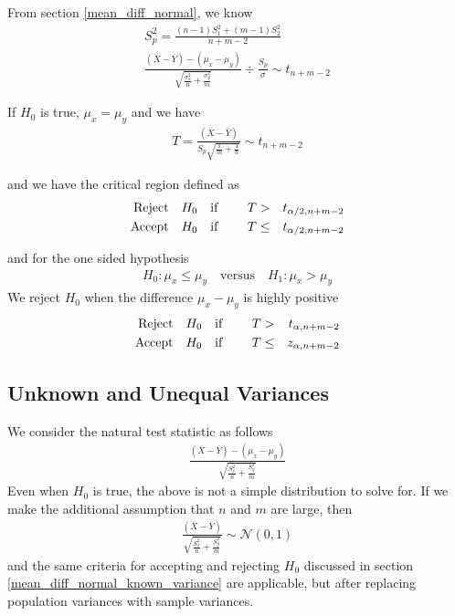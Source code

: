 \documentclass[../probability-notes.tex]{subfiles}
\begin{document}
    From section \ref{mean_diff_normal}, we know
    \begin{align*}
        S_{p}^{2} = \frac{(n-1)S_{1}^{2} + (m-1)S_{2}^{2}}{n + m - 2}\\
        \frac{(\overline{X} - \overline{Y}) - (\mu_{x} - \mu_{y})}{\sqrt{\frac{\sigma_{x}^{2}}{n} + \frac{\sigma_{y}^{2}}{m}}} \div \frac{S_{p}}{\sigma} \sim t_{n+m-2}
    \end{align*}

    If $H_{0}$ is true, $\mu_{x} = \mu_{y}$ and we have
    \begin{align*}
        T = \frac{(\overline{X} - \overline{Y})}{S_{p}\sqrt{\frac{1}{m} + \frac{1}{n}}} \sim t_{n+m-2}
    \end{align*}

    and we have the critical region defined as
    \begin{alignat*}{4}
        \text{Reject\quad} &H_{0} \text{\quad if \quad} &T &> &t_{\alpha/2, n+m-2}\\
        \text{Accept\quad} &H_{0} \text{\quad if\quad} &T &\leq &t_{\alpha/2, n+m-2}
    \end{alignat*}

    and for the one sided hypothesis
    \begin{align*}
        H_{0}: \mu_{x} \leq \mu_{y} \quad \text{versus} \quad H_{1}: \mu_{x} > \mu_{y}
    \end{align*}
    We reject $H_{0}$ when the difference $\mu_{x} - \mu_{y}$ is highly positive
    \begin{alignat*}{4}
        \text{Reject\quad} &H_{0} \text{\quad if \quad} &T &> &t_{\alpha, n+m-2}\\
        \text{Accept\quad} &H_{0} \text{\quad if\quad} &T &\leq &z_{\alpha, n+m-2}
    \end{alignat*}


    \subsection{Unknown and Unequal Variances}
    We consider the natural test statistic as follows
    \begin{align*}
        \frac{(\overline{X} - \overline{Y}) - (\mu_{x} - \mu_{y})}{\sqrt{\frac{S_{x}^{2}}{n} + \frac{S_{y}^{2}}{m}}}
    \end{align*}
    Even when $H_{0}$ is true, the above is not a simple distribution to solve for. If we make the additional assumption that $n$ and $m$ are large, then
    \begin{align*}
        \frac{(\overline{X} - \overline{Y})}{\sqrt{\frac{S_{x}^{2}}{n} + \frac{S_{y}^{2}}{m}}} \sim \mathcal{N}(0, 1)
    \end{align*}
    and the same criteria for accepting and rejecting $H_{0}$ discussed in section \ref{mean_diff_normal_known_variance} are applicable, but after replacing population variances with sample variances.\newline
\end{document}

